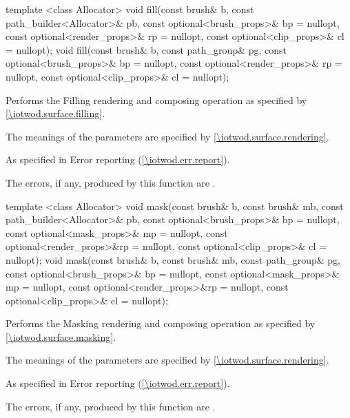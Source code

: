 %
%
\begin{itemdecl}
template <class Allocator>
void fill(const brush& b, const path_builder<Allocator>& pb,
  const optional<brush_props>& bp = nullopt,
  const optional<render_props>& rp = nullopt,
  const optional<clip_props>& cl = nullopt);
void fill(const brush& b, const path_group& pg,
  const optional<brush_props>& bp = nullopt,
  const optional<render_props>& rp = nullopt,
  const optional<clip_props>& cl = nullopt);
\end{itemdecl}
\begin{itemdescr}
\pnum
\effects
Performs the Filling rendering and composing operation as specified by \ref{\iotwod.surface.filling}.

\pnum
The meanings of the parameters are specified by \ref{\iotwod.surface.rendering}.

\pnum
\throws
As specified in Error reporting (\ref{\iotwod.err.report}).

\pnum
\errors
The errors, if any, produced by this function are .
\end{itemdescr}

%
%
\begin{itemdecl}
template <class Allocator>
void mask(const brush& b, const brush& mb,
  const path_builder<Allocator>& pb,
  const optional<brush_props>& bp = nullopt,
  const optional<mask_props>& mp = nullopt,
  const optional<render_props>&rp = nullopt,
  const optional<clip_props>& cl = nullopt);
void mask(const brush& b, const brush& mb, const path_group& pg,
  const optional<brush_props>& bp = nullopt,
  const optional<mask_props>& mp = nullopt,
  const optional<render_props>&rp = nullopt,
  const optional<clip_props>& cl = nullopt);
\end{itemdecl}
\begin{itemdescr}
\pnum
\effects
Performs the Masking rendering and composing operation as specified by \ref{\iotwod.surface.masking}.

\pnum
The meanings of the parameters are specified by \ref{\iotwod.surface.rendering}.

\pnum
\throws
As specified in Error reporting (\ref{\iotwod.err.report}).

\pnum
\errors

The errors, if any, produced by this function are .
\end{itemdescr}
